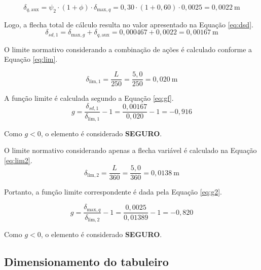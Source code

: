 \begin{equation}
\delta_{q,\text{aux}} = \psi_2 \cdot (1 + \phi) \cdot \delta_{\text{max},q}
                      = 0{,}30 \cdot (1 + 0{,}60) \cdot 0{,}0025
                      = 0{,}0022\ \text{m}
\label{eq:corrfle}
\end{equation}

Logo, a flecha total de cálculo resulta no valor apresentado na Equação \eqref{eq:dsd}.
\begin{equation}
\delta_{sd,1} = \delta_{\text{max},g} + \delta_{q,\text{aux}}
              = 0{,}000467 + 0{,}0022
              = 0{,}00167 \ \text{m}
\label{eq:dsd}
\end{equation}

O limite normativo considerando a combinação de ações é calculado conforme a Equação \eqref{eq:lim}.

\begin{equation}
\delta_{\text{lim},1} = \frac{L}{250}
                      = \frac{5{,}0}{250}
                      = 0{,}020\ \text{m}
\label{eq:lim}                      
\end{equation}

A função limite é calculada segundo a Equação \eqref{eq:gf}.
\begin{equation}
g = \frac{\delta_{sd,1}}{\delta_{\text{lim},1}} - 1
    = \frac{0{,}00167}{0{,}020} - 1
    = -0{,}916
\label{eq:gf}
\end{equation}

Como $g < 0$, o elemento é considerado \textbf{SEGURO}.

O limite normativo considerando apenas a flecha variável é calculado na Equação \eqref{eq:lim2}.
\begin{equation}
\delta_{\text{lim},2} = \frac{L}{360}
                      = \frac{5{,}0}{360}
                      = 0{,}0138\ \text{m}
\label{eq:lim2}                      
\end{equation}

Portanto, a função limite correspondente é dada pela Equação \eqref{eq:g2}.

\begin{equation}
g = \frac{\delta_{\text{max},q}}{\delta_{\text{lim},2}} - 1
    = \frac{0{,}0025}{0{,}01389} - 1
    = -0{,}820
\label{eq:g2}
\end{equation}

Como $g < 0$, o elemento é considerado \textbf{SEGURO}.

\subsection{Dimensionamento do tabuleiro}

